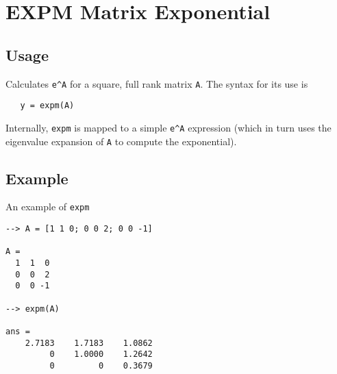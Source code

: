 \section{EXPM Matrix Exponential}

\subsection{Usage}

Calculates \verb|e^A| for a square, full rank matrix \verb|A|.  The
syntax for its use is
\begin{verbatim}
   y = expm(A)
\end{verbatim}
Internally, \verb|expm| is mapped to a simple \verb|e^A| expression (which
in turn uses the eigenvalue expansion of \verb|A| to compute the
exponential).
\subsection{Example}

An example of \verb|expm|
\begin{verbatim}
--> A = [1 1 0; 0 0 2; 0 0 -1]

A = 
  1  1  0 
  0  0  2 
  0  0 -1 

--> expm(A)

ans = 
    2.7183    1.7183    1.0862 
         0    1.0000    1.2642 
         0         0    0.3679 
\end{verbatim}
